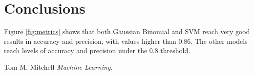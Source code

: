 \documentclass[12pt]{article}
\begin{document}
\section{Conclusions}
Figure \ref{fig:metrics} shows that both Gaussian Binomial and SVM reach very good results in accuracy and precision, with values higher than 0.86. The other models reach levels of accuracy and precision under the 0.8 threshold.

\newpage
\begin{thebibliography}{10}
	
	Tom M. Mitchell \textsl{Machine Learning}.
	
\end{thebibliography}
\end{document}
